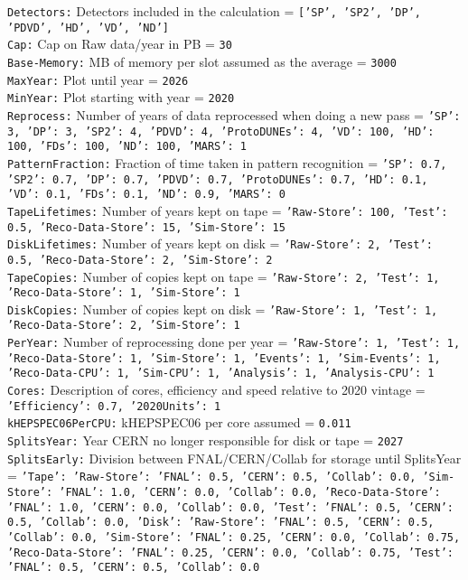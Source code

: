 
{\tt Detectors:} Detectors included in the calculation = {\tt ['SP', 'SP2', 'DP', 'PDVD', 'HD', 'VD', 'ND']} \\
{\tt Cap:} Cap on Raw data/year in PB = {\tt 30} \\
{\tt Base-Memory:} MB of memory per slot assumed as the average = {\tt 3000} \\
{\tt MaxYear:} Plot until year = {\tt 2026} \\
{\tt MinYear:} Plot starting with year = {\tt 2020} \\
{\tt Reprocess:} Number of years of data reprocessed when doing a new pass = {\tt {'SP': 3, 'DP': 3, 'SP2': 4, 'PDVD': 4, 'ProtoDUNEs': 4, 'VD': 100, 'HD': 100, 'FDs': 100, 'ND': 100, 'MARS': 1}} \\
{\tt PatternFraction:} Fraction of time taken in pattern recognition = {\tt {'SP': 0.7, 'SP2': 0.7, 'DP': 0.7, 'PDVD': 0.7, 'ProtoDUNEs': 0.7, 'HD': 0.1, 'VD': 0.1, 'FDs': 0.1, 'ND': 0.9, 'MARS': 0}} \\
{\tt TapeLifetimes:} Number of years kept on tape = {\tt {'Raw-Store': 100, 'Test': 0.5, 'Reco-Data-Store': 15, 'Sim-Store': 15}} \\
{\tt DiskLifetimes:} Number of years kept on disk = {\tt {'Raw-Store': 2, 'Test': 0.5, 'Reco-Data-Store': 2, 'Sim-Store': 2}} \\
{\tt TapeCopies:} Number of copies kept on tape = {\tt {'Raw-Store': 2, 'Test': 1, 'Reco-Data-Store': 1, 'Sim-Store': 1}} \\
{\tt DiskCopies:} Number of copies kept on disk = {\tt {'Raw-Store': 1, 'Test': 1, 'Reco-Data-Store': 2, 'Sim-Store': 1}} \\
{\tt PerYear:} Number of reprocessing done per year = {\tt {'Raw-Store': 1, 'Test': 1, 'Reco-Data-Store': 1, 'Sim-Store': 1, 'Events': 1, 'Sim-Events': 1, 'Reco-Data-CPU': 1, 'Sim-CPU': 1, 'Analysis': 1, 'Analysis-CPU': 1}} \\
{\tt Cores:} Description of cores, efficiency and speed relative to 2020 vintage = {\tt {'Efficiency': 0.7, '2020Units': 1}} \\
{\tt kHEPSPEC06PerCPU:} kHEPSPEC06 per core assumed = {\tt 0.011} \\
{\tt SplitsYear:} Year CERN no longer responsible for disk or tape = {\tt 2027} \\
{\tt SplitsEarly:} Division between FNAL/CERN/Collab for storage until SplitsYear = {\tt {'Tape': {'Raw-Store': {'FNAL': 0.5, 'CERN': 0.5, 'Collab': 0.0}, 'Sim-Store': {'FNAL': 1.0, 'CERN': 0.0, 'Collab': 0.0}, 'Reco-Data-Store': {'FNAL': 1.0, 'CERN': 0.0, 'Collab': 0.0}, 'Test': {'FNAL': 0.5, 'CERN': 0.5, 'Collab': 0.0}}, 'Disk': {'Raw-Store': {'FNAL': 0.5, 'CERN': 0.5, 'Collab': 0.0}, 'Sim-Store': {'FNAL': 0.25, 'CERN': 0.0, 'Collab': 0.75}, 'Reco-Data-Store': {'FNAL': 0.25, 'CERN': 0.0, 'Collab': 0.75}, 'Test': {'FNAL': 0.5, 'CERN': 0.5, 'Collab': 0.0}}}} \\
